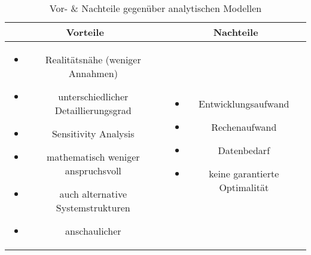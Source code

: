 \begin{table}
  \centering
  \begin{tabular}{c|c}
    Vorteile                         & Nachteile \\
    \hline
    \begin{minipage}{0.45\textwidth}
      \begin{itemize}
        \item Realitätsnähe (weniger Annahmen)
        \item unterschiedlicher Detaillierungsgrad
        \item Sensitivity Analysis
        \item mathematisch weniger anspruchsvoll
        \item auch alternative Systemstrukturen
        \item anschaulicher
      \end{itemize}
    \end{minipage} &
    \begin{minipage}{0.45\textwidth}
      \begin{itemize}
        \item Entwicklungsaufwand
        \item Rechenaufwand
        \item Datenbedarf
        \item keine garantierte Optimalität
      \end{itemize}
    \end{minipage}
  \end{tabular}
  \caption{Vor- \& Nachteile gegenüber analytischen Modellen}
\end{table}